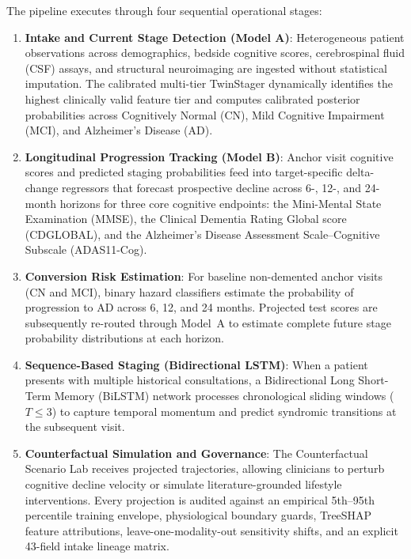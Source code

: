 The pipeline executes through four sequential operational stages:
\begin{enumerate}
    \item \textbf{Intake and Current Stage Detection (Model A)}: Heterogeneous patient observations across demographics, bedside cognitive scores, cerebrospinal fluid (CSF) assays, and structural neuroimaging are ingested without statistical imputation. The calibrated multi-tier TwinStager dynamically identifies the highest clinically valid feature tier and computes calibrated posterior probabilities across Cognitively Normal (CN), Mild Cognitive Impairment (MCI), and Alzheimer's Disease (AD).
    \item \textbf{Longitudinal Progression Tracking (Model B)}: Anchor visit cognitive scores and predicted staging probabilities feed into target-specific delta-change regressors that forecast prospective decline across 6-, 12-, and 24-month horizons for three core cognitive endpoints: the Mini-Mental State Examination (MMSE), the Clinical Dementia Rating Global score (CDGLOBAL), and the Alzheimer's Disease Assessment Scale--Cognitive Subscale (ADAS11-Cog).
    \item \textbf{Conversion Risk Estimation}: For baseline non-demented anchor visits (CN and MCI), binary hazard classifiers estimate the probability of progression to AD across 6, 12, and 24 months. Projected test scores are subsequently re-routed through Model~A to estimate complete future stage probability distributions at each horizon.
    \item \textbf{Sequence-Based Staging (Bidirectional LSTM)}: When a patient presents with multiple historical consultations, a Bidirectional Long Short-Term Memory (BiLSTM) network processes chronological sliding windows ($T \le 3$) to capture temporal momentum and predict syndromic transitions at the subsequent visit.
    \item \textbf{Counterfactual Simulation and Governance}: The Counterfactual Scenario Lab receives projected trajectories, allowing clinicians to perturb cognitive decline velocity or simulate literature-grounded lifestyle interventions. Every projection is audited against an empirical 5th--95th percentile training envelope, physiological boundary guards, TreeSHAP feature attributions, leave-one-modality-out sensitivity shifts, and an explicit 43-field intake lineage matrix.
\end{enumerate}

